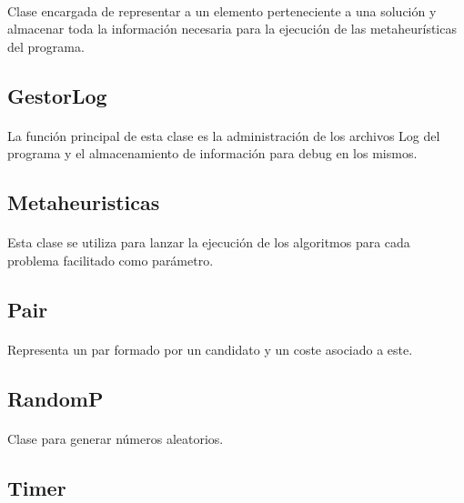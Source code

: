 \documentclass{article}
\begin{document}
	\paragraph{}Clase encargada de representar a un elemento perteneciente a una solución y almacenar toda la información necesaria para la ejecución de las metaheurísticas del programa.
	
	\subsection{GestorLog}
	
	\paragraph{}La función principal de esta clase es la administración de los archivos Log del programa y el almacenamiento de información para debug en los mismos.
	
	\subsection{Metaheuristicas}
	
	\paragraph{}Esta clase se utiliza para lanzar la ejecución de los algoritmos para cada problema facilitado como parámetro.
	
	\subsection{Pair}
	
	\paragraph{}Representa un par formado por un candidato y un coste asociado a este.
	
	\subsection{RandomP}
	
	\paragraph{}Clase para generar números aleatorios.
	
	\subsection{Timer}
	
\end{document}
